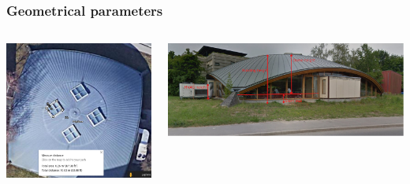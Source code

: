 \begin{frame}
    \frametitle{Geometrical parameters}
    \begin{columns}
        \begin{column}{0.3\textwidth}
            \centering
            \includegraphics[height=\textwidth]{Images/google_maps_polydome_skylights.png}
        \end{column}
        \begin{column}{0.7\textwidth}
            \centering
            \includegraphics[height=0.45\textwidth]{Images/polydome_streetview_annotated.png}
        \end{column}
    \end{columns}


\end{frame}
